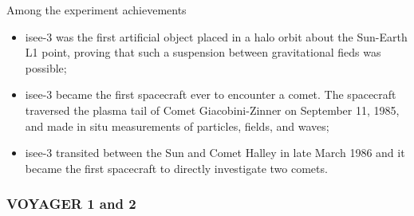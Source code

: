Among the experiment achievements
\begin{itemize}
\item \gls{isee}-3 was the first artificial object placed in a halo
  orbit about the Sun-Earth L1 point, proving that such a suspension
  between gravitational fieds was possible;
\item \gls{isee}-3 became the first spacecraft ever to encounter a
  comet. The spacecraft traversed the plasma tail of Comet
  Giacobini-Zinner on September 11, 1985, and made in situ
  measurements of particles, fields, and waves;
\item \gls{isee}-3 transited between the Sun and Comet Halley in late March
1986 and it became the first spacecraft to directly investigate two
comets.
\end{itemize}


\subsubsection*{VOYAGER 1 and 2}

